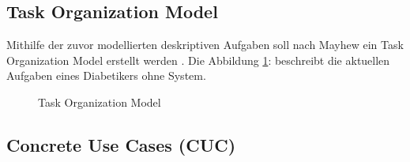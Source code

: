  \subsection{Task Organization Model}
 Mithilfe der zuvor modellierten deskriptiven Aufgaben soll nach Mayhew ein Task Organization Model erstellt werden \cite{MD}. Die Abbildung \ref{img:taskorganizationmodel}:   beschreibt die aktuellen Aufgaben eines Diabetikers ohne System.
 \begin{figure}[H]
 	\centering
 	\setlength{\fboxsep}{1pt}
 	\setlength{\fboxrule}{1pt}
 	\captionsetup{justification=centering}
 	\caption{Task Organization Model}
 	\label{img:taskorganizationmodel}
 \end{figure}
 \subsection{Concrete Use Cases (CUC)}
